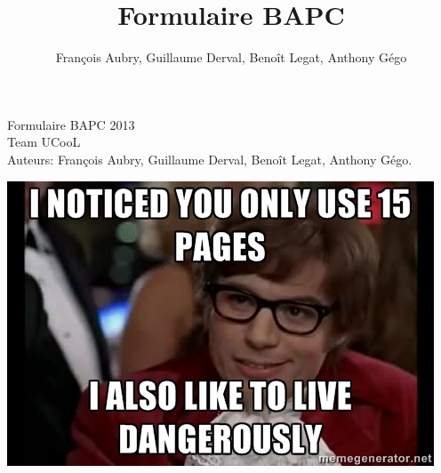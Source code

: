 \documentclass[2pt,a4paper]{article}
\author{François Aubry, Guillaume Derval, Benoît Legat, Anthony Gégo}
\title{Formulaire BAPC}
\begin{document}
\begin{multicols}{2}
{\Huge Formulaire BAPC 2013}\\
{\Large Team UCooL}\\
Auteurs: François Aubry, Guillaume Derval, Benoît Legat, Anthony Gégo.
\tableofcontents






\begin{center}
\includegraphics[width=\linewidth]{dangerously.jpg}
\end{center}
\end{multicols}
\end{document}
